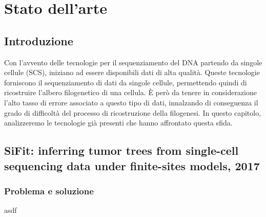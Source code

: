
\chapter{Stato dell'arte}
\label{chap:art}


\section{Introduzione}

Con l'avvento delle tecnologie per il sequenziamento del DNA partendo da singole cellule (SCS), iniziano ad essere disponibili dati di alta qualità. Queste tecnologie forniscono il sequenziamento di dati da singole cellule, permettendo quindi di ricostruire l'albero filogenetico di una cellula. È però da tenere in considerazione l'alto tasso di errore associato a questo tipo di dati, innalzando di conseguenza il grado di difficoltà del processo di ricostruzione della filogenesi. 
In questo capitolo, analizzeremo le tecnologie già presenti che hanno affrontato questa sfida. 


\section{SiFit: inferring tumor trees from single-cell sequencing data under finite-sites models, 2017 \cite{zafar2017sifit} }

\subsection{Problema e soluzione}

asdf